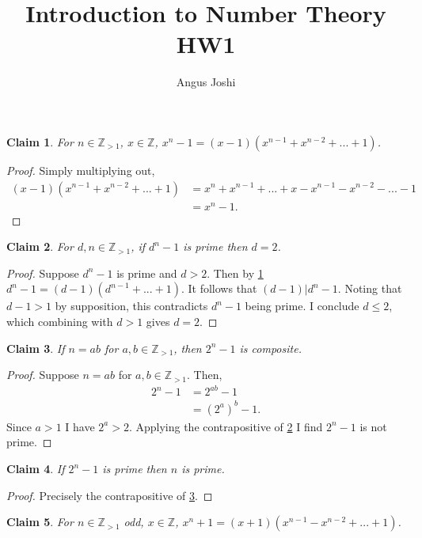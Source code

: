\documentclass{article}
\title{Introduction to Number Theory HW1}
\author{Angus Joshi}
\newcommand{\zg}{\mathbb{Z}_{>1}}
\newcommand{\Z}{\mathbb{Z}}
\newtheorem{claim}{Claim}
\begin{document}
  \maketitle
  \begin{claim}\label{minusFactors}
    For $n \in \zg$, $x \in \Z$, $x^n - 1 = (x - 1)(x^{n-1} + x^{n-2} + ... + 1)$.
  \end{claim}
  \begin{proof}
    Simply multiplying out,
    \begin{align*}
      (x - 1)(x^{n-1} + x^{n-2} + ... + 1) &= x^n + x^{n-1} + ... + x - x^{n-1} - x^{n-2} - ... - 1 \\
      &= x^n - 1.
    \end{align*}
  \end{proof}
  \begin{claim}\label{minusNotPrime}
    For $d, n \in \zg$, if $d^n - 1$ is prime then $d = 2$.
  \end{claim}
  \begin{proof}
    Suppose $d^n - 1$ is prime and $d>2$. Then by \cref{minusFactors} $d^n - 1 = (d-1)(d^{n-1} + ... + 1)$.
    It follows that $(d - 1) | d^n - 1$. Noting that $d - 1 > 1$ by supposition, this contradicts $d^n - 1$ being prime. 
    I conclude $d \leq 2$, which combining with $d > 1$ gives $d = 2$.
  \end{proof}
  \begin{claim}\label{ncomp}
    If $n = ab$ for $a, b \in \zg$, then $2^n - 1$ is composite.
  \end{claim}
  \begin{proof}
    Suppose $n = ab$ for $a, b \in \zg$. Then,
    \begin{align*}
      2^n - 1 &= 2^{ab} - 1 \\
              &= \left( 2^a \right)^b - 1.
    \end{align*}
    Since $a > 1$ I have $2^a > 2$. Applying the contrapositive of \cref{minusNotPrime} I find $2^n - 1$ is not prime.
  \end{proof}
  \begin{claim}
    If $2^n - 1$ is prime then $n$ is prime.
  \end{claim}
  \begin{proof}
    Precisely the contrapositive of \cref{ncomp}.
  \end{proof}
  \begin{claim}\label{oddFactor}
    For $n \in \zg$ odd, $x \in \Z$, $x^n + 1 = (x + 1)(x^{n - 1} - x^{n - 2} + ... + 1)$.
  \end{claim}
\end{document}
